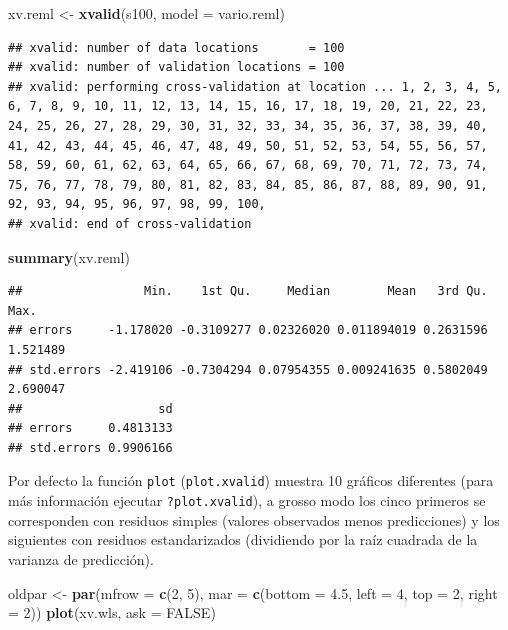 \documentclass[
]{book}
\newenvironment{Shaded}{\begin{snugshade}}{\end{snugshade}}
\newcommand{\AttributeTok}[1]{\textcolor[rgb]{0.13,0.29,0.53}{#1}}
\newcommand{\ConstantTok}[1]{\textcolor[rgb]{0.56,0.35,0.01}{#1}}
\newcommand{\DecValTok}[1]{\textcolor[rgb]{0.00,0.00,0.81}{#1}}
\newcommand{\FloatTok}[1]{\textcolor[rgb]{0.00,0.00,0.81}{#1}}
\newcommand{\FunctionTok}[1]{\textcolor[rgb]{0.13,0.29,0.53}{\textbf{#1}}}
\newcommand{\NormalTok}[1]{#1}
\newcommand{\OtherTok}[1]{\textcolor[rgb]{0.56,0.35,0.01}{#1}}
\theoremstyle{break}
\theoremstyle{definition}
\theoremstyle{definition}
\theoremstyle{definition}
\theoremstyle{definition}
\theoremstyle{remark}
\begin{document}
\begin{Shaded}
\begin{Highlighting}[]
\NormalTok{xv.reml }\OtherTok{\textless{}{-}} \FunctionTok{xvalid}\NormalTok{(s100, }\AttributeTok{model =}\NormalTok{ vario.reml)}
\end{Highlighting}
\end{Shaded}

\begin{verbatim}
## xvalid: number of data locations       = 100
## xvalid: number of validation locations = 100
## xvalid: performing cross-validation at location ... 1, 2, 3, 4, 5, 6, 7, 8, 9, 10, 11, 12, 13, 14, 15, 16, 17, 18, 19, 20, 21, 22, 23, 24, 25, 26, 27, 28, 29, 30, 31, 32, 33, 34, 35, 36, 37, 38, 39, 40, 41, 42, 43, 44, 45, 46, 47, 48, 49, 50, 51, 52, 53, 54, 55, 56, 57, 58, 59, 60, 61, 62, 63, 64, 65, 66, 67, 68, 69, 70, 71, 72, 73, 74, 75, 76, 77, 78, 79, 80, 81, 82, 83, 84, 85, 86, 87, 88, 89, 90, 91, 92, 93, 94, 95, 96, 97, 98, 99, 100, 
## xvalid: end of cross-validation
\end{verbatim}

\begin{Shaded}
\begin{Highlighting}[]
\FunctionTok{summary}\NormalTok{(xv.reml)}
\end{Highlighting}
\end{Shaded}

\begin{verbatim}
##                 Min.    1st Qu.     Median        Mean   3rd Qu.     Max.
## errors     -1.178020 -0.3109277 0.02326020 0.011894019 0.2631596 1.521489
## std.errors -2.419106 -0.7304294 0.07954355 0.009241635 0.5802049 2.690047
##                   sd
## errors     0.4813133
## std.errors 0.9906166
\end{verbatim}

Por defecto la función \texttt{plot} (\texttt{plot.xvalid}) muestra 10 gráficos
diferentes (para más información ejecutar \texttt{?plot.xvalid}), a grosso modo
los cinco primeros se corresponden con residuos simples (valores
observados menos predicciones) y los siguientes con residuos
estandarizados (dividiendo por la raíz cuadrada de la varianza de
predicción).

\begin{Shaded}
\begin{Highlighting}[]
\NormalTok{oldpar }\OtherTok{\textless{}{-}} \FunctionTok{par}\NormalTok{(}\AttributeTok{mfrow =} \FunctionTok{c}\NormalTok{(}\DecValTok{2}\NormalTok{, }\DecValTok{5}\NormalTok{), }\AttributeTok{mar =} \FunctionTok{c}\NormalTok{(}\AttributeTok{bottom =} \FloatTok{4.5}\NormalTok{, }\AttributeTok{left =} \DecValTok{4}\NormalTok{, }\AttributeTok{top =} \DecValTok{2}\NormalTok{, }\AttributeTok{right =} \DecValTok{2}\NormalTok{))}
\FunctionTok{plot}\NormalTok{(xv.wls, }\AttributeTok{ask =} \ConstantTok{FALSE}\NormalTok{)}
\end{Highlighting}
\end{Shaded}
\end{document}
